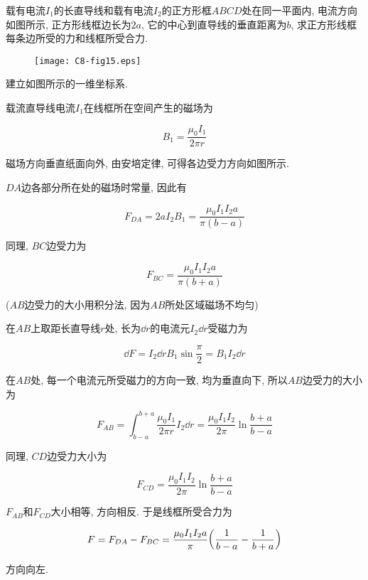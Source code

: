 \begin{example}
	载有电流$I_1$的长直导线和载有电流$I_2$的正方形框$ABCD$处在同一平面内, 电流方向如图所示, 正方形线框边长为$2a$, 它的中心到直导线的垂直距离为$b$, 求正方形线框每条边所受的力和线框所受合力. 
	
	\begin{figure}[H]
		\centering
		\texttt{[image: C8-fig15.eps]}
	\end{figure}
	
	\begin{solution}
		
		建立如图所示的一维坐标系.
		
		载流直导线电流$I_1$在线框所在空间产生的磁场为
		
		\begin{equation*}
			B_1 = \dfrac{\mu_0 I_1}{2 \pi r}
		\end{equation*}
		
		磁场方向垂直纸面向外, 由安培定律, 可得各边受力方向如图所示. 
		
		$DA$边各部分所在处的磁场时常量, 因此有
		
		\begin{equation*}
			F_{DA} = 2aI_2 B_1 = \dfrac{\mu_0 I_1 I_2 a}{\pi (b - a)}
		\end{equation*}
		
		同理, $BC$边受力为
		
		\begin{equation*}
			F_{BC} = \dfrac{\mu_0 I_1 I_2 a}{\pi (b + a)}
		\end{equation*}
		
		($AB$边受力的大小用积分法, 因为$AB$所处区域磁场不均匀)
		
		在$AB$上取距长直导线$r$处, 长为$\dd{r}$的电流元$I_2\dd{r}$受磁力为
		
		\begin{equation*}
			\dd{F} = I_2 \dd{r} B_1 \sin \dfrac{\pi}{2} = B_1 I_2 \dd{r}
		\end{equation*}
		
		在$AB$处, 每一个电流元所受磁力的方向一致, 均为垂直向下, 所以$AB$边受力的大小为
		
		\begin{equation*}
			F_{AB} = \int_{b-a}^{b+a} \dfrac{\mu_0 I_1}{2 \pi r} I_2 \dd{r} = \dfrac{\mu_0 I_1 I_2}{2 \pi} \ln \dfrac{b+a}{b-a}
		\end{equation*}
		
		同理, $CD$边受力大小为
		
		\begin{equation*}
			F_{CD} = \dfrac{\mu_0 I_1 I_2}{2 \pi} \ln \dfrac{b+a}{b-a}
		\end{equation*}
		
		$F_{AB}$和$F_{CD}$大小相等, 方向相反. 于是线框所受合力为
		
		\begin{equation*}
			F = F_{DA} - F_{BC} = \dfrac{\mu_0 I_1 I_2 a}{\pi} \qty(\dfrac{1}{b - a} - \dfrac{1}{b + a})
		\end{equation*}
		
		方向向左. 
		
	\end{solution}
	
\end{example}

